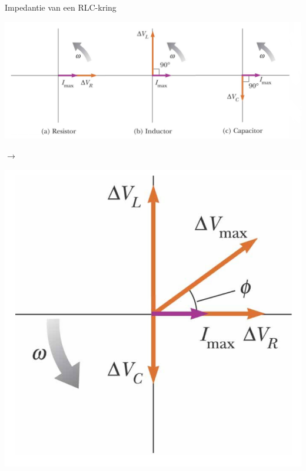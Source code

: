 \begin{theo}{Impedantie van een RLC-kring}
    \begin{minipage}{.69\textwidth}
        \vspace{0.4cm}
        \hspace{-0,75cm}\includegraphics[scale = 0.48]{Images/Magnetisme/PotentialenFasoren.png}
    \end{minipage}
    \hspace{-0.3cm}$\longrightarrow$
    \begin{minipage}{.31\textwidth}
        \vspace{0.1cm}
        \includegraphics[scale = 0.3]{Images/Magnetisme/PotentiaalFasoren.png}
    \end{minipage}


\end{theo}
